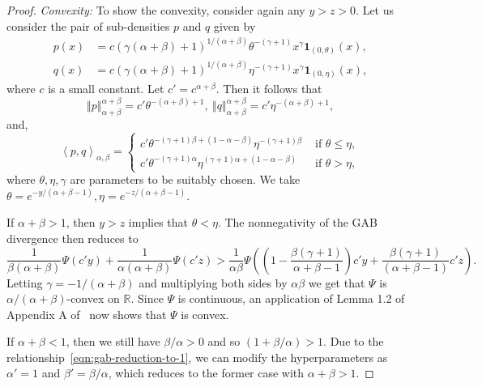 \documentclass[11pt]{article}
\theoremstyle{plain}
\theoremstyle{remark}
\def\R{\mathbb{R}}
\newcommand{\bb}[1]{\boldsymbol{#1}}
\newcommand{\norm}[1]{\left\Vert #1 \right\Vert}
\newcommand{\inner}[1]{\left\langle #1\right\rangle}
\begin{document}
\begin{proof}
    \noindent\emph{Convexity:} To show the convexity, consider again any $y > z > 0$. Let us consider the pair of sub-densities $p$ and $q$ given by
    \begin{align}
        p(x) & = c(\gamma(\alpha+\beta) + 1)^{1/(\alpha+\beta)}\theta^{-(\gamma+1)}x^{\gamma}\bb{1}_{(0,\theta)}(x),\nonumber \\
        q(x) & = c(\gamma(\alpha+\beta) + 1)^{1/(\alpha+\beta)}\eta^{-(\gamma+1)}x^{\gamma}\bb{1}_{(0,\eta)}(x),
        \label{eqn:f-g-power-family}
    \end{align}
    \noindent where $c$ is a small constant. Let $c' = c^{\alpha+\beta}$. Then it follows that
    \begin{equation*}
        \norm{p}_{\alpha+\beta}^{\alpha+\beta} =  c'\theta^{-(\alpha+\beta)+1},
        \
        \norm{q}_{\alpha+\beta}^{\alpha+\beta} = c' \eta^{-(\alpha+\beta)+1},
    \end{equation*}
    \noindent and,
    \begin{equation*}
        \inner{p,q}_{\alpha,\beta} = \begin{cases}
            c'\theta^{-(\gamma+1)\beta + (1-\alpha-\beta)} \eta^{-(\gamma+1)\beta} & \text{ if } \theta \leq \eta, \\
            c'\theta^{-(\gamma+1)\alpha} \eta^{(\gamma+1)\alpha+(1-\alpha-\beta)}  & \text{ if } \theta > \eta,
        \end{cases}
    \end{equation*}
    \noindent where $\theta, \eta, \gamma$ are parameters to be suitably chosen. We take $\theta = e^{-y/(\alpha+\beta - 1)}, \eta = e^{-z/(\alpha+\beta-1)}$.

    If $\alpha + \beta > 1$, then $y > z$ implies that $\theta < \eta$. The nonnegativity of the GAB divergence then reduces to
    \begin{equation*}
        \dfrac{1}{\beta(\alpha+\beta)}\Psi(c' y) + \dfrac{1}{\alpha(\alpha+\beta)}\Psi(c' z)
        > \dfrac{1}{\alpha\beta} \Psi\left( \left( 1 - \frac{\beta(\gamma+1)}{\alpha+\beta - 1} \right)c'y + \frac{\beta(\gamma+1)}{(\alpha+\beta-1)}c' z \right).
    \end{equation*}
    \noindent Letting $\gamma = -1/(\alpha+\beta)$ and multiplying both sides by $\alpha\beta$ we get that $\Psi$ is $\alpha/(\alpha+\beta)$-convex on $\R$. Since $\Psi$ is continuous, an application of Lemma 1.2 of Appendix A of~\citep{ray2023functional} now shows that $\Psi$ is convex.

    If $\alpha + \beta < 1$, then we still have $\beta/\alpha > 0$ and so $(1 + \beta/\alpha) > 1$. Due to the relationship~\eqref{eqn:gab-reduction-to-1}, we can modify the hyperparameters as $\alpha' = 1$ and $\beta' = \beta/\alpha$, which reduces to the former case with $\alpha + \beta > 1$.


\end{proof}
\end{document}
